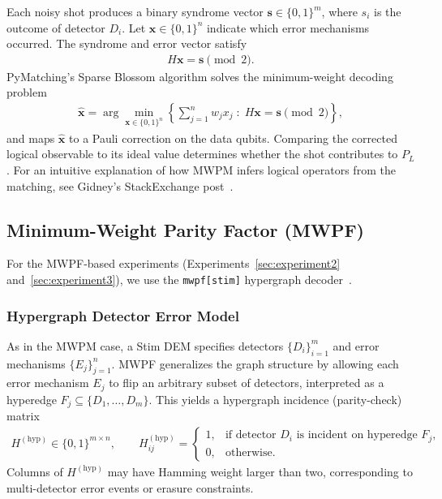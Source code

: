 \documentclass[11pt, notitlepage, letterpaper]{article}
\begin{document}
Each noisy shot produces a binary syndrome vector $\mathbf{s} \in \{0,1\}^m$, where $s_i$ is the outcome of detector $D_i$. Let $\mathbf{x} \in \{0,1\}^n$ indicate which error mechanisms occurred. The syndrome and error vector satisfy
\begin{align}
    H \mathbf{x} = \mathbf{s} \pmod{2}.
\end{align}
PyMatching's Sparse Blossom algorithm solves the minimum-weight decoding problem
\begin{align}
    \hat{\mathbf{x}}
    =
    \arg\min_{\mathbf{x} \in \{0,1\}^n}
    \left\{
    \sum_{j=1}^n w_j x_j
    \;:\;
    H \mathbf{x} = \mathbf{s} \pmod{2}
    \right\},
\end{align}
and maps $\hat{\mathbf{x}}$ to a Pauli correction on the data qubits. Comparing the corrected logical observable to its ideal value determines whether the shot contributes to $P_L$. For an intuitive explanation of how MWPM infers logical operators from the matching, see Gidney's StackExchange post~\cite{gidney_answer_2023-1}.

\subsection{Minimum-Weight Parity Factor (MWPF)}
\label{appendix:mwpf-details}

For the MWPF-based experiments (Experiments~\ref{sec:experiment2} and~\ref{sec:experiment3}), we use the \texttt{mwpf[stim]} hypergraph decoder~\cite{wu_yuewuomwpf_2025,wu_minimum-weight_2025}.

\subsubsection*{Hypergraph Detector Error Model}

As in the MWPM case, a Stim DEM specifies detectors $\{D_i\}_{i=1}^m$ and error mechanisms $\{E_j\}_{j=1}^n$. MWPF generalizes the graph structure by allowing each error mechanism $E_j$ to flip an arbitrary subset of detectors, interpreted as a hyperedge $F_j \subseteq \{D_1,\dots,D_m\}$. This yields a hypergraph incidence (parity-check) matrix
\begin{align}
    H^{(\mathrm{hyp})} \in \{0,1\}^{m\times n}, \qquad
    H^{(\mathrm{hyp})}_{ij} =
    \begin{cases}
        1, & \text{if detector } D_i \text{ is incident on hyperedge } F_j, \\[4pt]
        0, & \text{otherwise}.
    \end{cases}
\end{align}
Columns of $H^{(\mathrm{hyp})}$ may have Hamming weight larger than two, corresponding to multi-detector error events or erasure constraints.
\end{document}
